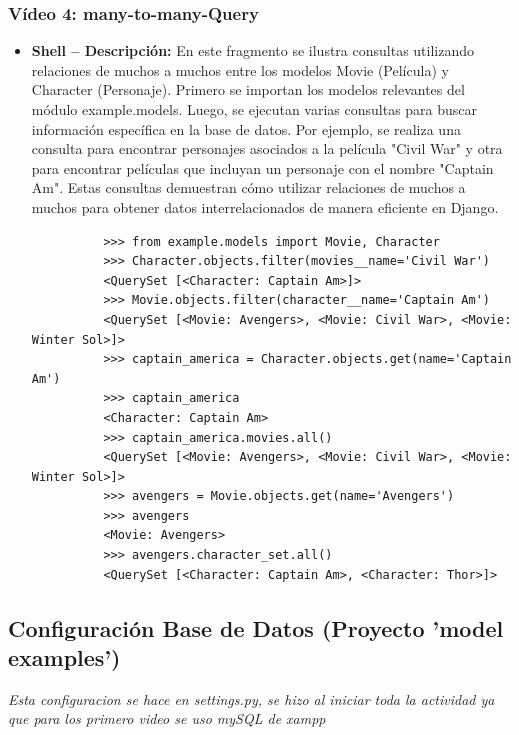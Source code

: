 \documentclass{article}
\begin{document}
  \subsubsection{Vídeo 4: many-to-many-Query}
    \begin{itemize}
      \item \textbf{Shell -- Descripción: }En este fragmento se ilustra consultas utilizando relaciones de muchos a muchos 
        entre los modelos Movie (Película) y Character (Personaje). Primero se importan los modelos relevantes del módulo example.models. 
        Luego, se ejecutan varias consultas para buscar información específica en la base de datos. Por ejemplo, se realiza una consulta 
        para encontrar personajes asociados a la película "Civil War" y otra para encontrar películas que incluyan un personaje con el nombre 
        "Captain Am". Estas consultas demuestran cómo utilizar relaciones de muchos a muchos para obtener datos interrelacionados de manera 
        eficiente en Django.
        \begin{lstlisting}
          >>> from example.models import Movie, Character
          >>> Character.objects.filter(movies__name='Civil War')
          <QuerySet [<Character: Captain Am>]>
          >>> Movie.objects.filter(character__name='Captain Am')
          <QuerySet [<Movie: Avengers>, <Movie: Civil War>, <Movie: Winter Sol>]>
          >>> captain_america = Character.objects.get(name='Captain Am')
          >>> captain_america
          <Character: Captain Am>
          >>> captain_america.movies.all()
          <QuerySet [<Movie: Avengers>, <Movie: Civil War>, <Movie: Winter Sol>]>
          >>> avengers = Movie.objects.get(name='Avengers')
          >>> avengers
          <Movie: Avengers>
          >>> avengers.character_set.all()
          <QuerySet [<Character: Captain Am>, <Character: Thor>]>
        \end{lstlisting}
    \end{itemize}
  

  \subsection{Configuración Base de Datos (Proyecto 'model examples') }
  \textit{Esta configuracion se hace en settings.py, se hizo al iniciar toda la actividad ya que para los primero video se uso mySQL de xampp}
  
\end{document}
